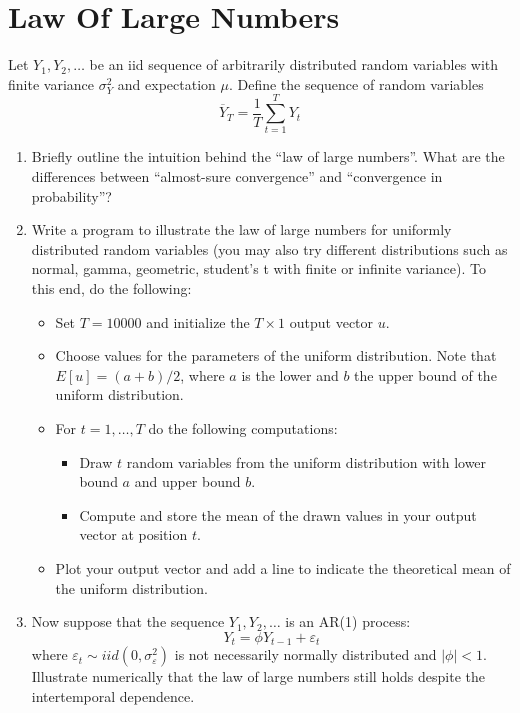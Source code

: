 \section[Law Of Large Numbers]{Law Of Large Numbers\label{ex:LawOfLargeNumbers}}
Let \(Y_{1},Y_{2},\ldots \) be an iid sequence of arbitrarily distributed random variables
  with finite variance \(\sigma_Y ^{2}\) and expectation \(\mu \).
Define the sequence of random variables
\begin{equation*}
\overline{Y}_{T}=\frac{1}{T}\sum_{t=1}^{T}Y_{t}
\end{equation*}
\begin{enumerate}

\item
Briefly outline the intuition behind the \enquote{law of large numbers}.
What are the differences between \enquote{almost-sure convergence}
  and \enquote{convergence in probability}?

\item Write a program to illustrate the law of large numbers for uniformly distributed random variables
  (you may also try different distributions such as normal, gamma, geometric, student's t with finite or infinite variance).
To this end, do the following:
\begin{itemize}
  \item
  Set \(T=10000\) and initialize the \(T \times 1\) output vector \(u\).

  \item
  Choose values for the parameters of the uniform distribution.
  Note that \(E[u] = (a+b)/2\), where \(a\) is the lower and \(b\) the upper bound of the uniform distribution.

  \item
  For \(t=1,\ldots,T\) do the following computations:
  \begin{itemize}
    \item
    Draw \(t\) random variables from the uniform distribution with lower bound \(a\) and upper bound \(b\).
    \item
    Compute and store the mean of the drawn values in your output vector at position \(t\).
  \end{itemize}

  \item
  Plot your output vector and add a line to indicate the theoretical mean of the uniform distribution.
\end{itemize}

\item
Now suppose that the sequence \(Y_{1},Y_{2},\ldots \) is an AR{(1)} process:
\[Y_{t} =\phi Y_{t-1} +\varepsilon _{t}\]
where \(\varepsilon _{t}\sim iid(0,\sigma _{\varepsilon }^{2})\) is not necessarily normally distributed and \(|\phi |<1\).
Illustrate numerically that the law of large numbers still holds despite the intertemporal dependence.
\end{enumerate}

